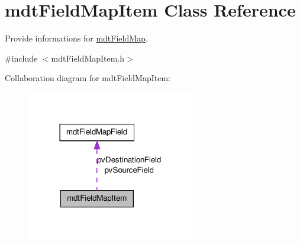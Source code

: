 \hypertarget{classmdt_field_map_item}{
\section{mdtFieldMapItem Class Reference}
\label{classmdt_field_map_item}
}


Provide informations for \hyperlink{classmdt_field_map}{mdtFieldMap}.  




{\ttfamily \#include $<$mdtFieldMapItem.h$>$}



Collaboration diagram for mdtFieldMapItem:\nopagebreak
\begin{figure}[H]
\begin{center}
\leavevmode
\includegraphics[width=209pt]{classmdt_field_map_item__coll__graph}
\end{center}
\end{figure}
